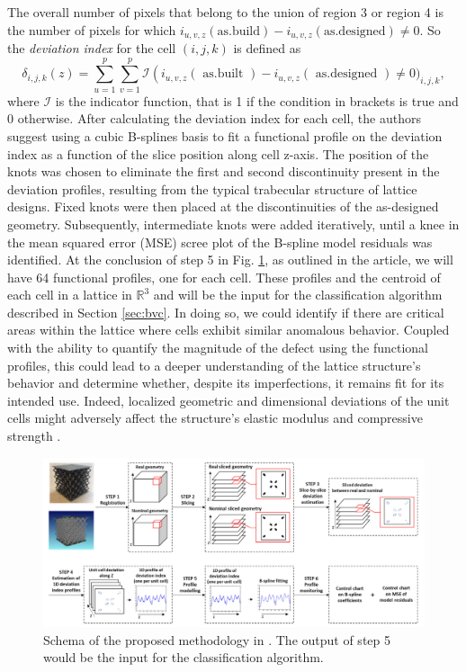The overall number of pixels that belong to the union of region 3 or region 4 is the number of pixels for which $i_{u,v,z}(\text{as.build}) - i_{u,v,z}(\text{as.designed}) \neq 0$. So the \emph{deviation index} for the cell $(i,j,k)$ is defined as
\begin{equation}
\label{eq:deviationindex}
\delta_{i, j, k}(z)= \sum_{u=1}^p \sum_{v=1}^p \mathcal{I}\left(i_{u, v, z}(\text { as.built })\right. -i_{u, v, z}(\text { as.designed })\neq 0)_{i, j, k},
\end{equation}
where $\mathcal{I}$ is the indicator function, that is 1 if the condition in brackets is true and 0 otherwise.
After calculating the deviation index for each cell, the authors suggest using a cubic B-splines basis to fit a functional profile on the deviation index as a function of the slice position along cell z-axis. The position of the knots was chosen to eliminate the first and second discontinuity present in the deviation profiles, resulting from the typical trabecular structure of lattice designs. Fixed knots were then placed at the discontinuities of the as-designed geometry. Subsequently, intermediate knots were added iteratively, until a knee in the mean squared error (MSE) scree plot of the B-spline model residuals was identified.
At the conclusion of step 5 in Fig. \ref{fig:colosimofunctional}, as outlined in the article, we will have 64 functional profiles, one for each cell. These profiles and the centroid of each cell in a lattice in $\mathbb{R}^3$ and will be the input for the classification algorithm described in Section \ref{sec:bvc}. In doing so, we could identify if there are critical areas within the lattice where cells exhibit similar anomalous behavior. Coupled with the ability to quantify the magnitude of the defect using the functional profiles, this could lead to a deeper understanding of the lattice structure's behavior and determine whether, despite its imperfections, it remains fit for its intended use. Indeed, localized geometric and dimensional deviations of the unit cells might adversely affect the structure's elastic modulus and compressive strength \cite{colosimo_complex_2022}.

\begin{figure}
    \centering
    \includegraphics[scale=0.5]{Images/colosimosplines.png}
    \caption[Functional control chart in complex geometries.]{Schema of the proposed methodology in \cite{colosimo_complex_2022}. The output of step 5 would be the input for the classification algorithm.}
    \label{fig:colosimofunctional}
\end{figure}


